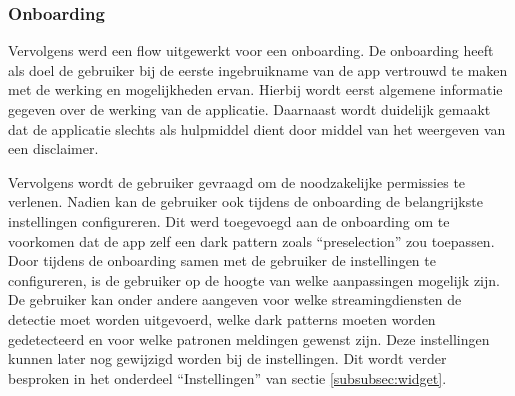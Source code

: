 \vspace{1em}

\subsubsection{Onboarding}

\vspace{1em}

Vervolgens werd een flow uitgewerkt voor een onboarding. De onboarding heeft als doel de gebruiker bij de eerste ingebruikname van de app vertrouwd te maken met de werking en mogelijkheden ervan. Hierbij wordt eerst algemene informatie gegeven over de werking van de applicatie. Daarnaast wordt duidelijk gemaakt dat de applicatie slechts als hulpmiddel dient door middel van het weergeven van een disclaimer.

\vspace{1em}

Vervolgens wordt de gebruiker gevraagd om de noodzakelijke permissies te verlenen. Nadien kan de gebruiker ook tijdens de onboarding de belangrijkste instellingen configureren. Dit werd toegevoegd aan de onboarding om te voorkomen dat de app zelf een dark pattern zoals ``preselection'' zou toepassen. Door tijdens de onboarding samen met de gebruiker de instellingen te configureren, is de gebruiker op de hoogte van welke aanpassingen mogelijk zijn. De gebruiker kan onder andere aangeven voor welke streamingdiensten de detectie moet worden uitgevoerd, welke dark patterns moeten worden gedetecteerd en voor welke patronen meldingen gewenst zijn. Deze instellingen kunnen later nog gewijzigd worden bij de instellingen. Dit wordt verder besproken in het onderdeel ``Instellingen'' van sectie \ref{subsubsec:widget}.

\vspace{1em}

